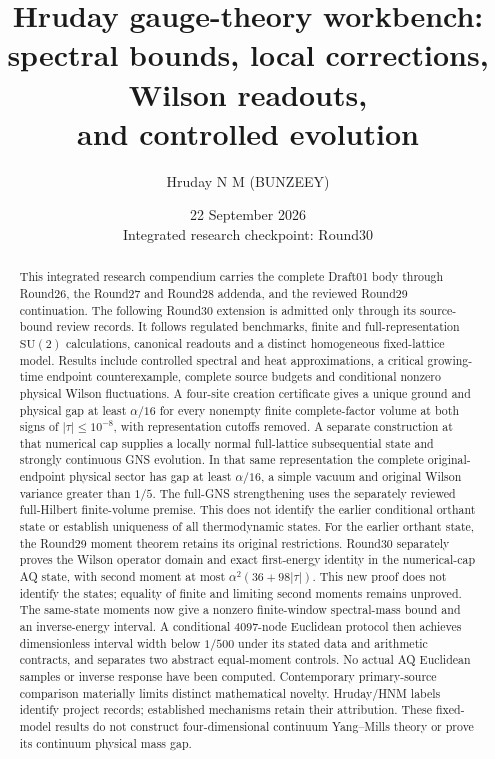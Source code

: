 \documentclass[11pt,a4paper]{article}
\title{Hruday gauge-theory workbench:\\spectral bounds, local corrections, Wilson readouts,\\and controlled evolution}
\author{Hruday N M (BUNZEEY)}
\date{22 September 2026\\\small Integrated research checkpoint: Round30}
\theoremstyle{definition}\newtheorem{definition}[theorem]{Definition}
\theoremstyle{remark}\newtheorem{remark}[theorem]{Remark}
\begin{document}
\maketitle
\begin{abstract}
This integrated research compendium carries the complete Draft01 body through Round26, the Round27 and Round28 addenda, and the reviewed Round29 continuation. The following Round30 extension is admitted only through its source-bound review records. It follows regulated benchmarks, finite and full-representation $\mathrm{SU}(2)$ calculations, canonical readouts and a distinct homogeneous fixed-lattice model. Results include controlled spectral and heat approximations, a critical growing-time endpoint counterexample, complete source budgets and conditional nonzero physical Wilson fluctuations. A four-site creation certificate gives a unique ground and physical gap at least $\alpha/16$ for every nonempty finite complete-factor volume at both signs of $|\tau|\le10^{-8}$, with representation cutoffs removed. A separate construction at that numerical cap supplies a locally normal full-lattice subsequential state and strongly continuous GNS evolution. In that same representation the complete original-endpoint physical sector has gap at least $\alpha/16$, a simple vacuum and original Wilson variance greater than $1/5$. The full-GNS strengthening uses the separately reviewed full-Hilbert finite-volume premise. This does not identify the earlier conditional orthant state or establish uniqueness of all thermodynamic states. For the earlier orthant state, the Round29 moment theorem retains its original restrictions. Round30 separately proves the Wilson operator domain and exact first-energy identity in the numerical-cap AQ state, with second moment at most $\alpha^2(36+98|\tau|)$. This new proof does not identify the states; equality of finite and limiting second moments remains unproved. The same-state moments now give a nonzero finite-window spectral-mass bound and an inverse-energy interval. A conditional 4097-node Euclidean protocol then achieves dimensionless interval width below $1/500$ under its stated data and arithmetic contracts, and separates two abstract equal-moment controls. No actual AQ Euclidean samples or inverse response have been computed. Contemporary primary-source comparison materially limits distinct mathematical novelty. Hruday/HNM labels identify project records; established mechanisms retain their attribution. These fixed-model results do not construct four-dimensional continuum Yang--Mills theory or prove its continuum physical mass gap.
\end{abstract}
\end{document}
